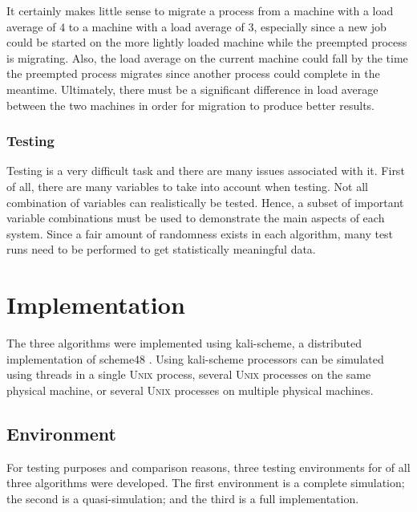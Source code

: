 \documentclass{report}
\newcommand{\UNIX}{\textsc{Unix}\xspace}
\begin{document}
It certainly makes little sense to migrate a process from a machine with a
load average of $4$ to a machine with a load average of $3$, especially
since a new job could be started on the more lightly loaded machine while
the preempted process is migrating.  Also, the load average on the current
machine could fall by the time the preempted process migrates since
another process could complete in the meantime.  Ultimately, there must be a
significant difference in load average between the two machines in order for
migration to produce better results.


\subsection{Testing}

Testing is a very difficult task and there are many issues associated with
it.  First of all, there are many variables to take into account when
testing.  Not all combination of variables can realistically be tested.
Hence, a subset of important variable combinations must be used to
demonstrate the main aspects of each system.  Since a fair amount of
randomness exists in each algorithm, many test runs need to be performed to
get statistically meaningful data.







\chapter{Implementation}

The three algorithms were implemented using kali-scheme, a distributed
implementation of scheme48 \cite{kali}.  Using kali-scheme processors can be
simulated using threads in a single \UNIX process, several \UNIX processes on
the same physical machine, or several \UNIX processes on multiple physical
machines.

\section{Environment}

For testing purposes and comparison reasons, three testing environments for
of all three algorithms were developed.  The first environment is a complete
simulation; the second is a quasi-simulation; and the third is a full
implementation.
\end{document}
